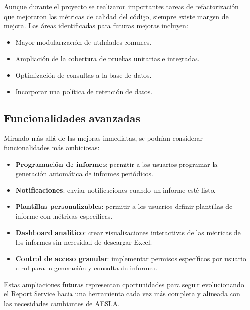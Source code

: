\documentclass[11pt,a4paper,titlepage,oneside]{report}
\begin{document}
Aunque durante el proyecto se realizaron importantes tareas de refactorización que mejoraron las métricas de calidad del código, siempre existe margen de mejora. Las áreas identificadas para futuras mejoras incluyen:

\begin{itemize}
    \item Mayor modularización de utilidades comunes.
    \item Ampliación de la cobertura de pruebas unitarias e integradas.
    \item Optimización de consultas a la base de datos.
    \item Incorporar una política de retención de datos.
\end{itemize}

\subsection{Funcionalidades avanzadas}

Mirando más allá de las mejoras inmediatas, se podrían considerar funcionalidades más ambiciosas:

\begin{itemize}
    \item \textbf{Programación de informes}: permitir a los usuarios programar la generación automática de informes periódicos.
    \item \textbf{Notificaciones}: enviar notificaciones cuando un informe esté listo.
    \item \textbf{Plantillas personalizables}: permitir a los usuarios definir plantillas de informe con métricas específicas.
    \item \textbf{Dashboard analítico}: crear visualizaciones interactivas de las métricas de los informes sin necesidad de descargar Excel.
    \item \textbf{Control de acceso granular}: implementar permisos específicos por usuario o rol para la generación y consulta de informes.
\end{itemize}

Estas ampliaciones futuras representan oportunidades para seguir evolucionando el Report Service hacia una herramienta cada vez más completa y alineada con las necesidades cambiantes de AESLA.



 \appendix
 \appendixpage
 
%

 \printglossary[type=\acronymtype,title=\nomeglosarioacronimos]
 \printglossary[title=\nomeglosariotermos]

 
 
 \clearpage
 
\end{document}
